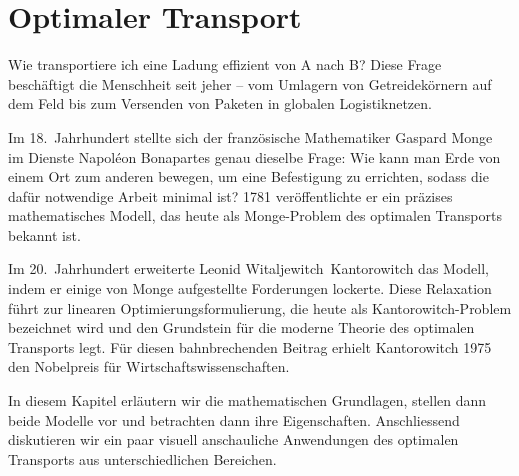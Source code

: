 %
%
%
%
\newcommand{\wasserstein}[1][p]{\mathcal{W}_{#1}}
\chapter{Optimaler Transport\label{chapter:mongekant}}
\begin{refsection}

\noindent
Wie transportiere ich eine Ladung effizient von A nach B?
Diese Frage beschäftigt die Menschheit seit jeher --
vom Umlagern von Getreidekörnern auf dem Feld
bis zum Versenden von Paketen in globalen Logistiknetzen.

Im 18.~Jahrhundert stellte sich der französische Mathematiker Gaspard Monge
im Dienste Napoléon Bonapartes genau dieselbe Frage:
Wie kann man Erde von einem Ort zum anderen bewegen,
um eine Befestigung zu errichten,
sodass die dafür notwendige Arbeit minimal ist?
1781 veröffentlichte er ein präzises mathematisches Modell,
das heute als Monge-Problem des optimalen Transports bekannt ist.

Im 20.~Jahrhundert erweiterte Leonid Witaljewitch~Kantorowitch das Modell,
indem er einige von Monge aufgestellte Forderungen lockerte.
Diese Relaxation führt zur linearen Optimierungsformulierung,
die heute als Kantorowitch-Problem bezeichnet wird
und den Grundstein für die moderne Theorie des optimalen Transports legt.
Für diesen bahnbrechenden Beitrag erhielt Kantorowitch 1975
den Nobelpreis für Wirtschaftswissenschaften.

In diesem Kapitel erläutern wir die mathematischen Grundlagen,
stellen dann beide Modelle vor und betrachten dann ihre Eigenschaften.
Anschliessend diskutieren wir ein paar visuell anschauliche Anwendungen
des optimalen Transports aus unterschiedlichen Bereichen.






\printbibliography[heading=subbibliography]
\end{refsection}
